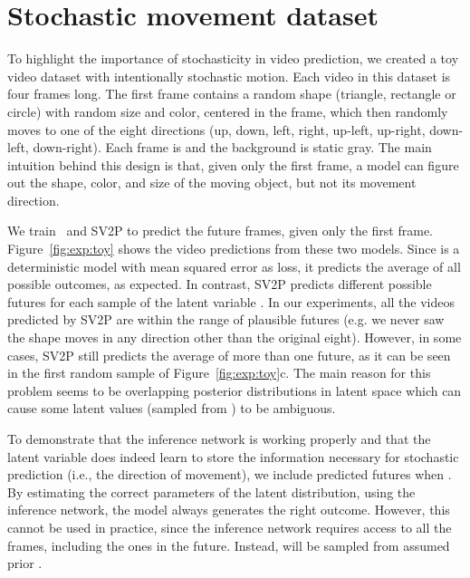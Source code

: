 \documentclass{article} \usepackage{iclr2018_conference,times}
\begin{document}
 
\section{Stochastic movement dataset}
To highlight the importance of stochasticity in video prediction, we created a toy video dataset with intentionally stochastic motion. Each video in this dataset is four frames long. The first frame contains a random shape (triangle, rectangle or circle) with random size and color, centered in the frame, which then randomly moves to one of the eight directions (up, down, left, right, up-left, up-right, down-left, down-right). Each frame is  and the background is static gray. The main intuition behind this design is that, given only the first frame, a model can figure out the shape, color, and size of the moving object, but not its movement direction.



We train~\cite{finn2016unsupervised} and SV2P to predict the future frames, given only the first frame. Figure~\ref{fig:exp:toy} shows the video predictions from these two models. Since \cite{finn2016unsupervised} is a deterministic model with mean squared error as loss, it predicts the average of all possible outcomes, as expected. In contrast, SV2P predicts different possible futures for each sample of the latent variable . In our experiments, all the videos predicted by SV2P are within the range of plausible futures (e.g. we never saw the shape moves in any direction other than the original eight). However, in some cases, SV2P still predicts the average of more than one future, as it can be seen in the first random sample of Figure~\ref{fig:exp:toy}c. The main reason for this problem seems to be overlapping posterior distributions in latent space which can cause some latent values (sampled from ) to be ambiguous. 


To demonstrate that the inference network is working properly and that the latent variable does indeed learn to store the information necessary for stochastic prediction (i.e., the direction of movement), we include predicted futures when .
By estimating the correct parameters of the latent distribution, using the inference network, the model always generates the right outcome. However, this cannot be used in practice, since the inference network requires access to all the frames, including the ones in the future. Instead,  will be sampled from assumed prior . 
\end{document}
